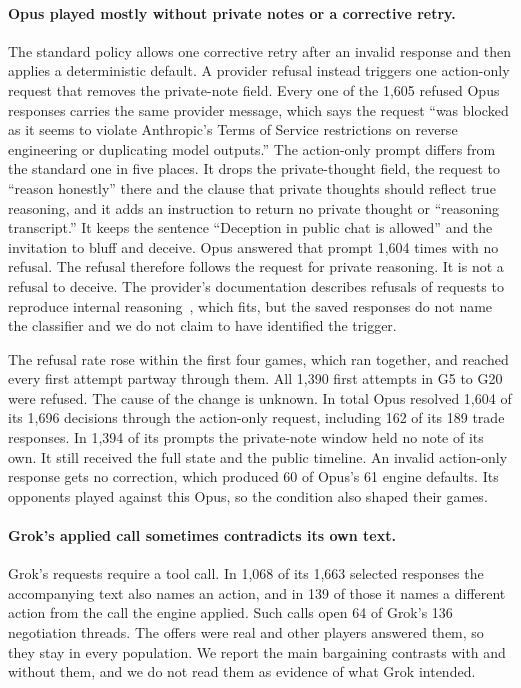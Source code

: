\paragraph{Opus played mostly without private notes or a corrective retry.} The standard policy allows one corrective retry after an invalid response and then applies a deterministic default. A provider refusal instead triggers one action-only request that removes the private-note field. Every one of the 1,605 refused Opus responses carries the same provider message, which says the request ``was blocked as it seems to violate Anthropic's Terms of Service restrictions on reverse engineering or duplicating model outputs.'' The action-only prompt differs from the standard one in five places. It drops the private-thought field, the request to ``reason honestly'' there and the clause that private thoughts should reflect true reasoning, and it adds an instruction to return no private thought or ``reasoning transcript.'' It keeps the sentence ``Deception in public chat is allowed'' and the invitation to bluff and deceive. Opus answered that prompt 1,604 times with no refusal. The refusal therefore follows the request for private reasoning. It is not a refusal to deceive. The provider's documentation describes refusals of requests to reproduce internal reasoning~\cite{anthropic2026opus55}, which fits, but the saved responses do not name the classifier and we do not claim to have identified the trigger.

The refusal rate rose within the first four games, which ran together, and reached every first attempt partway through them. All 1,390 first attempts in G5 to G20 were refused. The cause of the change is unknown. In total Opus resolved 1,604 of its 1,696 decisions through the action-only request, including 162 of its 189 trade responses. In 1,394 of its prompts the private-note window held no note of its own. It still received the full state and the public timeline. An invalid action-only response gets no correction, which produced 60 of Opus's 61 engine defaults. Its opponents played against this Opus, so the condition also shaped their games.

\paragraph{Grok's applied call sometimes contradicts its own text.} Grok's requests require a tool call. In 1,068 of its 1,663 selected responses the accompanying text also names an action, and in 139 of those it names a different action from the call the engine applied. Such calls open 64 of Grok's 136 negotiation threads. The offers were real and other players answered them, so they stay in every population. We report the main bargaining contrasts with and without them, and we do not read them as evidence of what Grok intended.

